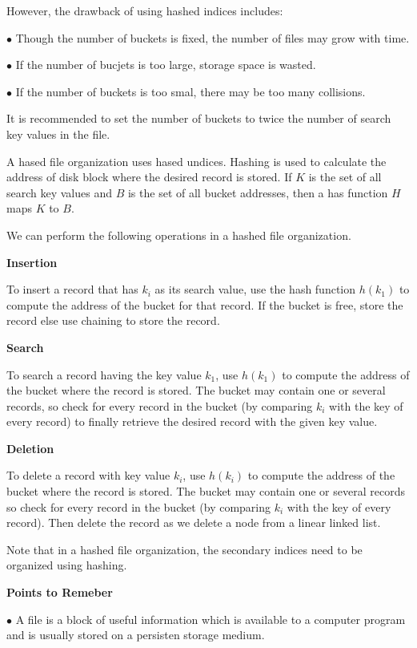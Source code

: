 \vskip 1mm
However, the drawback of using hashed indices includes:

\vskip 3mm
\qquad$\bullet$ Though the number of buckets is fixed, the number of files may grow with time.

\vskip 3mm
\qquad$\bullet$ If the number of bucjets is too large, storage space is wasted.

\vskip 3mm
\qquad$\bullet$ If the number of buckets is too smal, there may be too many collisions.

\vskip 1mm
It is recommended to set the number of buckets to twice the number of search key values in the file.

\vskip 1mm
A hased file organization uses hased undices. Hashing is used to calculate the address of disk block where the desired record is stored. If $K$ is the set of all search key values and $B$ is the set of all bucket addresses, then a has function $H$ maps $K$ to $B$.

\vskip 1mm
We can perform the following operations in a hashed file organization.

\vskip 3mm
{\bf Insertion}

\vskip 1mm
To insert a record that has $k_i$ as its search value, use the hash function $h(k_1)$ to compute the address of the bucket for that record. If the bucket is free, store the record else use chaining to store the record.

\vskip 3mm
{\bf Search}

\vskip 1mm
To search a record having the key value $k_1$, use $h(k_1)$ to compute the address of the bucket where the record is stored. The bucket may contain one or several records, so check for every record in the bucket (by comparing $k_i$ with the key of every record) to finally retrieve the desired record with the given key value.

\vskip 3mm
{\bf Deletion}

\vskip 1mm
To delete a record with key value $k_i$, use $h(k_i)$ to compute the address of the bucket where the record is stored. The bucket may contain one or several records so check for every record in the bucket (by comparing $k_i$ with the key of every record). Then delete the record as we delete a node from a linear linked list.

\vskip 1mm
Note that in a hashed file organization, the secondary indices need to be organized using hashing.

\filbreak
\vskip 1cm
{\bf Points to Remeber}

\vskip 3mm
\qquad$\bullet$ A file is a block of useful information which is available to a computer program and is usually stored on a persisten storage medium.

